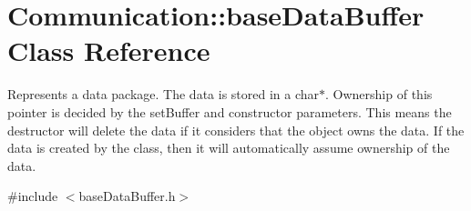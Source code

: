 \hypertarget{class_communication_1_1base_data_buffer}{}\section{Communication\+:\+:base\+Data\+Buffer Class Reference}
\label{class_communication_1_1base_data_buffer}


Represents a data package. The data is stored in a char$\ast$. Ownership of this pointer is decided by the set\+Buffer and constructor parameters. This means the destructor will delete the data if it considers that the object owns the data. If the data is created by the class, then it will automatically assume ownership of the data.  




{\ttfamily \#include $<$base\+Data\+Buffer.\+h$>$}

